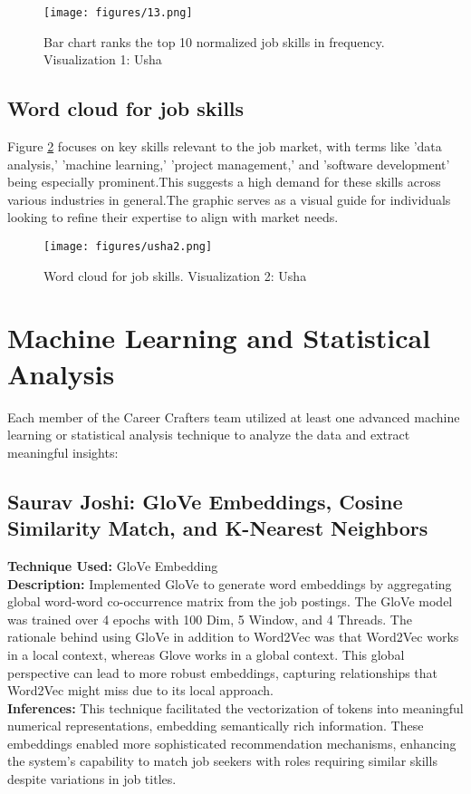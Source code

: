 \documentclass[a4paper,10pt]{article}
\begin{document}
    \begin{figure}[ht]
    \centering
    \texttt{[image: figures/13.png]}
    \caption{Bar chart ranks the top 10 normalized job skills in frequency. Visualization 1: Usha}
    \label{fig_top_10}
    \end{figure}
    
\subsection{Word cloud for job skills}
Figure \ref{fig_job_skills_word_cloud} focuses on key skills relevant to the job market, with terms like 'data analysis,' 'machine learning,' 'project management,' and 'software development' being especially prominent.This suggests a high demand for these skills across various industries in general.The graphic serves as a visual guide for individuals looking to refine their expertise to align with market needs.

    \begin{figure}[ht]
    \centering
    \texttt{[image: figures/usha2.png]}
    \caption{Word cloud for job skills. Visualization 2: Usha}
    \label{fig_job_skills_word_cloud}
    \end{figure}


\section{Machine Learning and Statistical Analysis}

Each member of the Career Crafters team utilized at least one advanced machine learning or statistical analysis technique to analyze the data and extract meaningful insights:

\subsection{Saurav Joshi: GloVe Embeddings, Cosine Similarity Match, and K-Nearest Neighbors}
\textbf{Technique Used:} GloVe Embedding\\
\textbf{Description:} Implemented GloVe to generate word embeddings by aggregating global word-word co-occurrence matrix from the job postings. The GloVe model was trained over 4 epochs with 100 Dim, 5 Window, and 4 Threads. The rationale behind using GloVe in addition to Word2Vec was that Word2Vec works in a local context, whereas Glove works in a global context. This global perspective can lead to more robust embeddings, capturing relationships that Word2Vec might miss due to its local approach.\\
\textbf{Inferences:} This technique facilitated the vectorization of tokens into meaningful numerical representations, embedding semantically rich information. These embeddings enabled more sophisticated recommendation mechanisms, enhancing the system's capability to match job seekers with roles requiring similar skills despite variations in job titles.
\end{document}
